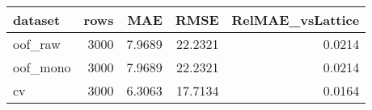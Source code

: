 \begin{tabular}{lrrrr}
\toprule
dataset & rows & MAE & RMSE & RelMAE_vsLattice \\
\midrule
oof_raw & 3000 & 7.9689 & 22.2321 & 0.0214 \\
oof_mono & 3000 & 7.9689 & 22.2321 & 0.0214 \\
cv & 3000 & 6.3063 & 17.7134 & 0.0164 \\
\bottomrule
\end{tabular}

